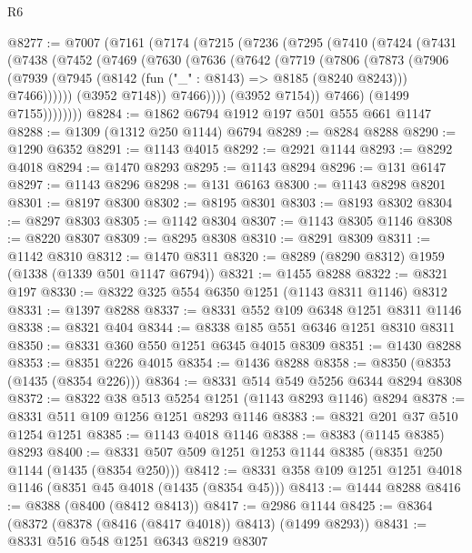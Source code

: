 \begin{lexlean}{R6}
\begin{coremodule}
@8277 := @7007
    (@7161
      (@7174
        (@7215
          (@7236
            (@7295
              (@7410
                (@7424
                  (@7431
                    (@7438
                      (@7452
                        (@7469
                          (@7630
                            (@7636
                              (@7642
                                (@7719
                                  (@7806
                                    (@7873
                                      (@7906
                                        (@7939
                                          (@7945
                                            (@8142 (fun ("_" : @8143) => @8185 (@8240 @8243)))
                                            @7466))))))
                                (@3952 @7148))
                              @7466))))
                      (@3952 @7154))
                    @7466)
                  (@1499 @7155))))))))
@8284 := @1862 @6794 @1912 @197 @501 @555 @661 @1147
@8288 := @1309 (@1312 @250 @1144) @6794
@8289 := @8284 @8288
@8290 := @1290 @6352
@8291 := @1143 @4015
@8292 := @2921 @1144
@8293 := @8292 @4018
@8294 := @1470 @8293
@8295 := @1143 @8294
@8296 := @131 @6147
@8297 := @1143 @8296
@8298 := @131 @6163
@8300 := @1143 @8298 @8201
@8301 := @8197 @8300
@8302 := @8195 @8301
@8303 := @8193 @8302
@8304 := @8297 @8303
@8305 := @1142 @8304
@8307 := @1143 @8305 @1146
@8308 := @8220 @8307
@8309 := @8295 @8308
@8310 := @8291 @8309
@8311 := @1142 @8310
@8312 := @1470 @8311
@8320 := @8289 (@8290 @8312) @1959 (@1338 (@1339 @501 @1147 @6794))
@8321 := @1455 @8288
@8322 := @8321 @197
@8330 := @8322 @325 @554 @6350 @1251 (@1143 @8311 @1146) @8312
@8331 := @1397 @8288
@8337 := @8331 @552 @109 @6348 @1251 @8311 @1146
@8338 := @8321 @404
@8344 := @8338 @185 @551 @6346 @1251 @8310 @8311
@8350 := @8331 @360 @550 @1251 @6345 @4015 @8309
@8351 := @1430 @8288
@8353 := @8351 @226 @4015
@8354 := @1436 @8288
@8358 := @8350 (@8353 (@1435 (@8354 @226)))
@8364 := @8331 @514 @549 @5256 @6344 @8294 @8308
@8372 := @8322 @38 @513 @5254 @1251 (@1143 @8293 @1146) @8294
@8378 := @8331 @511 @109 @1256 @1251 @8293 @1146
@8383 := @8321 @201 @37 @510 @1254 @1251
@8385 := @1143 @4018 @1146
@8388 := @8383 (@1145 @8385) @8293
@8400 := @8331 @507 @509 @1251 @1253 @1144 @8385 (@8351 @250 @1144 (@1435 (@8354 @250)))
@8412 := @8331 @358 @109 @1251 @1251 @4018 @1146 (@8351 @45 @4018 (@1435 (@8354 @45)))
@8413 := @1444 @8288
@8416 := @8388 (@8400 (@8412 @8413))
@8417 := @2986 @1144
@8425 := @8364 (@8372 (@8378 (@8416 (@8417 @4018)) @8413) (@1499 @8293))
@8431 := @8331 @516 @548 @1251 @6343 @8219 @8307

\end{coremodule}
\end{lexlean}
